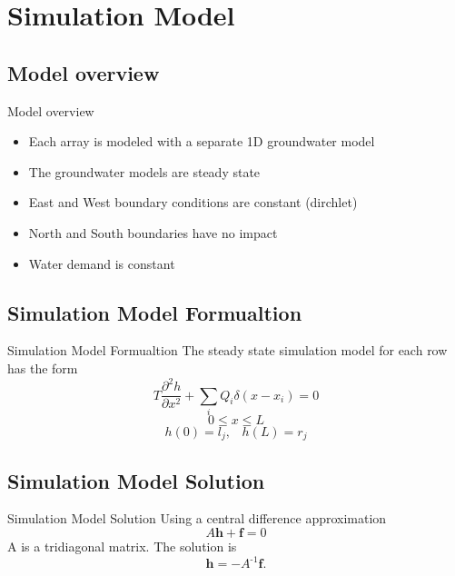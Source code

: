 \documentclass[xcolor=x11names,compress]{beamer}
\renewcommand{\(}{\begin{columns}}
\renewcommand{\)}{\end{columns}}
\newcommand{\<}[1]{\begin{column}{#1}}
\renewcommand{\>}{\end{column}}
\begin{document}
\section{Simulation Model}
\subsection{Model overview}
\begin{frame}{Model overview}

\begin{itemize}
\item Each array is modeled with a separate 1D groundwater model
\item The groundwater models are steady state  
\item East and West boundary conditions are constant (dirchlet)
\item North and South boundaries have no impact
\item Water demand is constant
\end{itemize}

\end{frame}


\subsection{Simulation Model Formualtion}
\begin{frame}{Simulation Model Formualtion}
The steady state simulation model for each row has the form 
$$
T\frac{\partial^2h}{\partial x^2}+\sum_iQ_i\delta(x-x_i)=0
$$
$$0\leq x\leq L$$
$$h(0)=l_j,\,\,\,\,\,h(L)=r_j$$
\end{frame}

\subsection{Simulation Model Solution}
\begin{frame}{Simulation Model Solution}
Using a central difference approximation
$$
A\mathbf{h}+\mathbf{f}=0
$$
A is a tridiagonal matrix.  The solution is
\pause
$$
\mathbf{h}=-A^{\mbox{-}1}\mathbf{f}.
$$
\end{frame}
\end{document}
